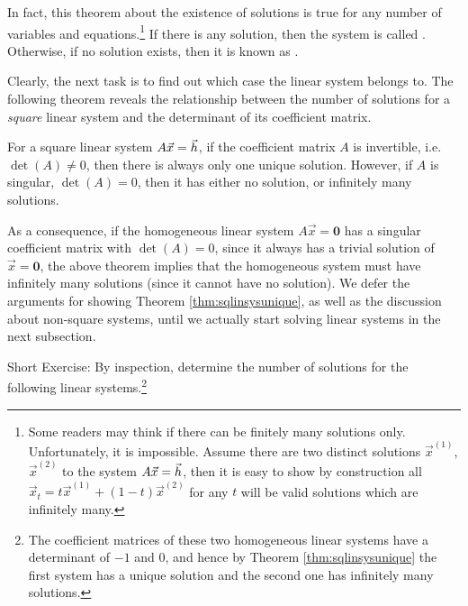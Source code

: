 In fact, this theorem about the existence of solutions is true for any number of variables and equations.\footnote{Some readers may think if there can be finitely many solutions only. Unfortunately, it is impossible. Assume there are two distinct solutions $\vec{x}^{(1)}$, $\vec{x}^{(2)}$ to the system $A\vec{x} = \smash{\vec{h}}$, then it is easy to show by construction all $\vec{x}_t = t\vec{x}^{(1)} + (1-t)\vec{x}^{(2)}$ for any $t$ will be valid solutions which are infinitely many.} If there is any solution, then the system is called . Otherwise, if no solution exists, then it is known as . \par

Clearly, the next task is to find out which case the linear system belongs to. The following theorem reveals the relationship between the number of solutions for a \textit{square} linear system and the determinant of its coefficient matrix.
\begin{thm}
\label{thm:sqlinsysunique}
For a square linear system $A\vec{x} = \smash{\vec{h}}$, if the coefficient matrix $A$ is invertible, i.e.\ $\det(A) \neq 0$, then there is always only one unique solution. However, if $A$ is singular, $\det(A) = 0$, then it has either no solution, or infinitely many solutions.
\end{thm}
As a consequence, if the homogeneous linear system $A\vec{x} = \textbf{0}$ has a singular coefficient matrix with $\det(A) = 0$, since it always has a trivial solution of $\vec{x} = \textbf{0}$, the above theorem implies that the homogeneous system must have infinitely many solutions (since it cannot have no solution). We defer the arguments for showing Theorem \ref{thm:sqlinsysunique}, as well as the discussion about non-square systems, until we actually start solving linear systems in the next subsection. \par
Short Exercise: By inspection, determine the number of solutions for the following linear systems.\footnote{The coefficient matrices of these two homogeneous linear systems have a determinant of $-1$ and $0$, and hence by Theorem \ref{thm:sqlinsysunique} the first system has a unique solution and the second one has infinitely many solutions.}
